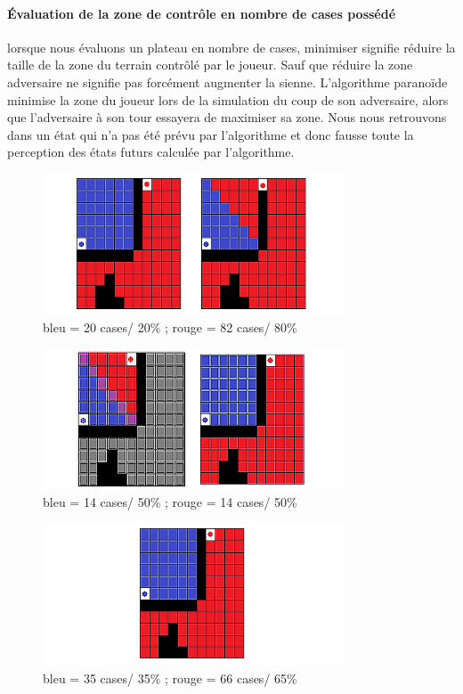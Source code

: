 \paragraph{Évaluation de la zone de contrôle en nombre de cases possédé}
lorsque nous évaluons un plateau en nombre de cases, minimiser
signifie réduire la taille de la zone du terrain contrôlé par le joueur.
Sauf que réduire la zone adversaire ne signifie pas forcément augmenter la
sienne. L'algorithme paranoïde minimise la zone du joueur lors de la 
simulation du coup de son adversaire, alors que l'adversaire à son tour
essayera de maximiser sa zone. Nous nous retrouvons dans un état qui n'a
pas été prévu par l'algorithme et donc fausse toute la perception des états
futurs calculée par l'algorithme.

\begin{figure}[H]
	\centering
	\includegraphics[width=0.8\textwidth]{./pics/nbr_case.png}	
	\caption{bleu = 20 cases/ 20\% ; rouge = 82 cases/ 80\%}
\end{figure}

\begin{figure}[H]
	\centering
	\includegraphics[width=0.8\textwidth]{./pics/nbr_case_mini.png}	
	\caption{bleu = 14 cases/ 50\% ; rouge = 14 cases/ 50\%}
\end{figure}

\begin{figure}[H]
	\centering
	\includegraphics[width=0.8\textwidth]{./pics/nbr_case_maxi.png}	
	\caption{bleu = 35 cases/ 35\% ; rouge = 66 cases/ 65\%}
\end{figure}



